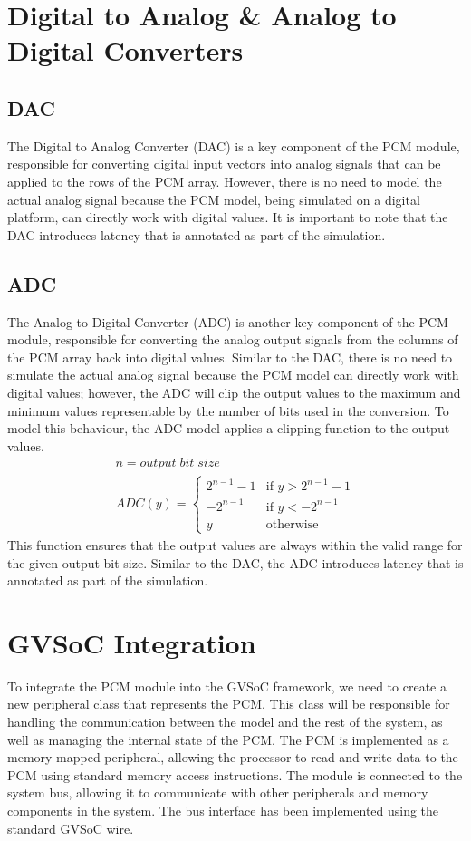 \section{Digital to Analog \& Analog to Digital Converters}\label{sec:mod_gvsoc}
\subsection{DAC}\label{sec:dac}
The Digital to Analog Converter (DAC) is a key component of the PCM module, responsible for converting digital input vectors into analog signals that can be applied to the rows of the PCM array.
However, there is no need to model the actual analog signal because the PCM model, being simulated on a digital platform, can directly work with digital values.
It is important to note that the DAC introduces latency that is annotated as part of the simulation.

\subsection{ADC}\label{sec:adc}
The Analog to Digital Converter (ADC) is another key component of the PCM module, responsible for converting the analog output signals from the columns of the PCM array back into digital values.
Similar to the DAC, there is no need to simulate the actual analog signal because the PCM model can directly work with digital values; however, the ADC will clip the output values to the maximum and minimum values representable by the number of bits used in the conversion.
To model this behaviour, the ADC model applies a  clipping function to the output values.
\begin{align}     
    n=output\;bit\;size\\
    ADC(y) = 
    \begin{cases}
    2^{n-1}-1 & \text{if } y > 2^{n-1}-1 \\
    -2^{n-1} & \text{if } y < -2^{n-1} \\
    y & \text{otherwise}
    \end{cases}
\end{align}
This function ensures that the output values are always within the valid range for the given output bit size.
Similar to the DAC, the ADC introduces latency that is annotated as part of the simulation.

\section{GVSoC Integration}\label{sec:gvsoc_int}
To integrate the PCM module into the GVSoC framework, we need to create a new peripheral class that represents the PCM.
This class will be responsible for handling the communication between the model and the rest of the system,
as well as managing the internal state of the PCM.
The PCM is implemented as a memory-mapped peripheral, allowing the processor to read and write data to the PCM using standard memory access instructions.
The module is connected to the system bus, allowing it to communicate with other peripherals and memory components in the system.
The bus interface has been implemented using the standard GVSoC wire.

